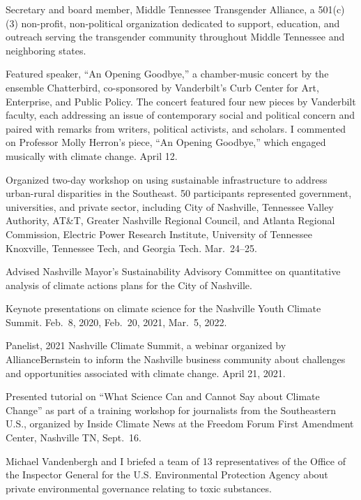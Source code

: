 \item[2024--present] Secretary and board member, Middle Tennessee Transgender Alliance, 
  a 501(c)(3) non-profit, non-political organization dedicated to support, education, 
  and outreach serving the transgender community throughout Middle Tennessee 
  and neighboring states.
\item[2023] Featured speaker, ``An Opening Goodbye,'' a chamber-music concert
  by the ensemble Chatterbird, co-sponsored by Vanderbilt's Curb Center for
  Art, Enterprise, and Public Policy. The concert featured four new pieces by
  Vanderbilt faculty, each addressing an issue of contemporary social and political
  concern and paired with remarks from writers, political activists, and scholars.
  I commented on Professor Molly Herron's piece, ``An Opening Goodbye,''
  which engaged musically with climate change.  April 12.
\item[2022] Organized two-day workshop on using sustainable infrastructure to
  address urban-rural disparities in the Southeast. 50 participants represented
  government, universities, and private sector, including City of Nashville,
  Tennessee Valley Authority, AT\&T, Greater Nashville Regional Council,
  and Atlanta Regional Commission, Electric Power Research Institute,
  University of Tennessee Knoxville, Tennessee Tech, and Georgia Tech.
  Mar.~24--25.
\item[2020--2022] Advised Nashville Mayor's Sustainability Advisory
Committee on quantitative analysis of climate actions plans for the City of
Nashville.
\item[2020--2022] Keynote presentations on climate science for the Nashville
Youth Climate Summit. Feb.~8, 2020, Feb.~20, 2021, Mar.~5, 2022.
\item[2021] Panelist, 2021 Nashville Climate Summit, a webinar organized by
 AllianceBernstein to inform the Nashville business community about
 challenges and opportunities associated with climate change. April 21, 2021.
\item[2019] Presented tutorial on ``What Science Can and Cannot Say about
  Climate Change'' as part of a training workshop for journalists from the
  Southeastern U.S., organized by Inside Climate News at the Freedom Forum
  First Amendment Center, Nashville TN, Sept.~16.
\item[2019] Michael Vandenbergh and I briefed a team of 13 representatives of
  the Office of the Inspector General for the U.S. Environmental Protection
  Agency about private environmental governance relating to toxic substances.
